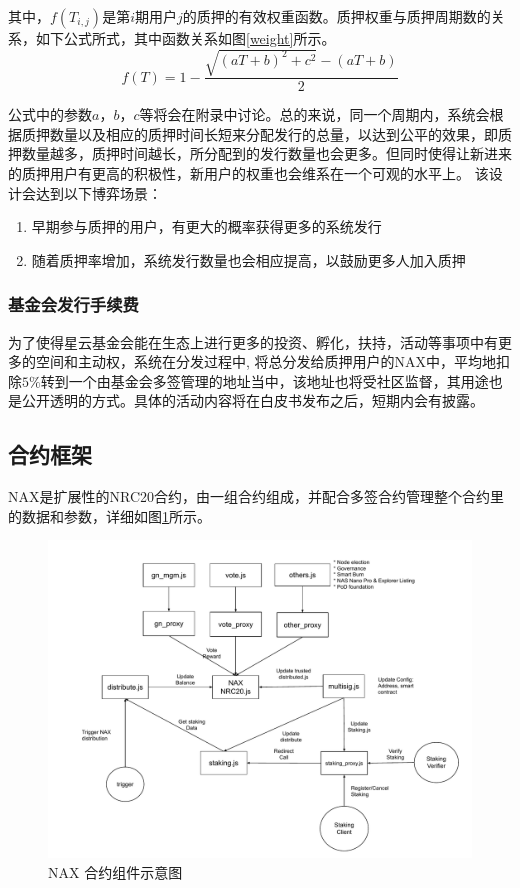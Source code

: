 其中，\(f(T_{i,j})\)是第\(i\)期用户\(j\)的质押的有效权重函数。质押权重与质押周期数的关系，如下公式所式，其中函数关系如图\ref{weight}所示。
\begin{equation}
  f(T) = 1 - \frac{\sqrt{(aT+b)^2+c^2}-(aT+b)}{2}
\end{equation}

公式中的参数$a$，$b$，$c$等将会在附录中讨论。总的来说，同一个周期内，系统会根据质押数量以及相应的质押时间长短来分配发行的总量，以达到公平的效果，即质押数量越多，质押时间越长，所分配到的发行数量也会更多。但同时使得让新进来的质押用户有更高的积极性，新用户的权重也会维系在一个可观的水平上。 该设计会达到以下博弈场景：

\begin{enumerate}[\hspace{1cm}(a)]
  \item 早期参与质押的用户，有更大的概率获得更多的系统发行
  \item 随着质押率增加，系统发行数量也会相应提高，以鼓励更多人加入质押
\end{enumerate}

\subsubsection{基金会发行手续费}
为了使得星云基金会能在生态上进行更多的投资、孵化，扶持，活动等事项中有更多的空间和主动权，系统在分发过程中, 将总分发给质押用户的NAX中，平均地扣除$5\%$转到一个由基金会多签管理的地址当中，该地址也将受社区监督，其用途也是公开透明的方式。具体的活动内容将在白皮书发布之后，短期内会有披露。

\subsection{合约框架}
NAX是扩展性的NRC20合约，由一组合约组成，并配合多签合约管理整个合约里的数据和参数，详细如图\ref{fig:nax_framework}所示。

\begin{figure}[htbp]
  \centering
    \includegraphics[width=1\textwidth]{../common/nax.pdf}
    \caption{NAX 合约组件示意图 \label{fig:nax_framework}}
\end{figure}